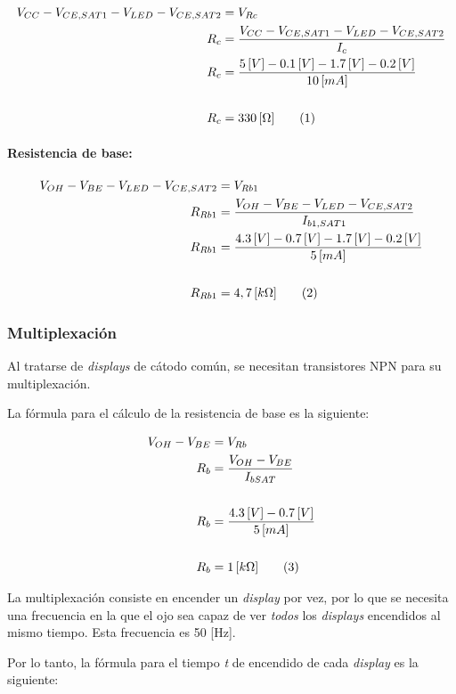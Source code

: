 \documentclass[12pt,a4paper]{article}
\newcommand\numberthis{\addtocounter{equation}{1}\tag{\theequation}}
\begin{document}
	\begin{align*}
	V_{CC} - V_{CE,SAT1} - V_{LED} - V_{CE,SAT2} &= V_{Rc}\\
	R_{c} &= \frac{V_{CC} - V_{CE,SAT1} - V_{LED} - V_{CE,SAT2}}{I_{c}}\\
	R_{c} &= \frac{5\,[V] - 0.1\,[V] - 1.7\,[V] - 0.2\,[V]}{10\,[mA]}\\
	\\R_{c} &= 330 \, [\Omega] \numberthis
	\end{align*}

\paragraph{Resistencia de base:}

	\begin{align*}
	V_{OH} - V_{BE} - V_{LED} - V_{CE,SAT2} &= V_{Rb1}\\
	R_{Rb1} &= \frac{V_{OH} - V_{BE} - V_{LED} - V_{CE,SAT2}}{I_{b1,SAT1}}\\
	R_{Rb1} &= \frac{4.3\,[V] - 0.7\,[V] - 1.7\,[V] - 0.2\,[V]}{5\,[mA]}\\
	\\R_{Rb1} &= 4,7 \, [k\Omega] \numberthis
	\end{align*}

\subsubsection{Multiplexación}	
	Al tratarse de \emph{displays} de cátodo común, se necesitan transistores NPN para su multiplexación.
	
	La fórmula para el cálculo de la resistencia de base es la siguiente:
	
	\begin{align*}
	V_{OH} - V_{BE} &= V_{Rb}\\
	R_{b} &= \frac{V_{OH} - V_{BE}}{I_{bSAT}}\\
	\\R_{b} &= \frac{4.3\,[V] - 0.7\,[V]}{5\,[mA]}\\	
	\\R_{b} &= 1\,[k \Omega] \numberthis
	\end{align*}		
	
	La multiplexación consiste en encender un \emph{display} por vez, por lo que se necesita una frecuencia en la que el ojo sea capaz de ver \emph{todos} los \emph{displays} encendidos al mismo tiempo. Esta frecuencia es 50 [Hz].
	
	Por lo tanto, la fórmula para el tiempo \emph{t} de encendido de cada \emph{display} es la siguiente:
\end{document}
